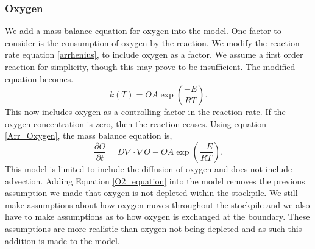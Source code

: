 \subsubsection{Oxygen}
We add a mass balance equation for oxygen into the model. One factor to consider is the consumption of oxygen by the reaction. We modify the reaction rate equation \ref{arrhenius}, to include oxygen as a factor. We assume a first order reaction for simplicity, though this may prove to be insufficient. The modified equation becomes.
\begin{equation}
k(T)=OA\exp\left(\frac{-E}{RT}\right). \label{Arr_Oxygen}
\end{equation}
This now includes oxygen as a controlling factor in the reaction rate. If the oxygen concentration is zero, then the reaction ceases. Using equation \ref{Arr_Oxygen}, the mass balance equation is,
\begin{equation}
\frac{\partial O}{\partial t}=D\nabla \cdot \nabla O - OA\exp\left(\frac{-E}{RT}\right). \label{O2_equation}
\end{equation}
This model is limited to include the diffusion of oxygen and does not include advection. Adding Equation \ref{O2_equation} into the model removes the previous assumption we made that oxygen is not depleted within the stockpile. We still make assumptions about how oxygen moves throughout the stockpile and we also have to make assumptions as to how oxygen is exchanged at the boundary. These assumptions are more realistic than oxygen not being depleted and as such this addition is made to the model.

